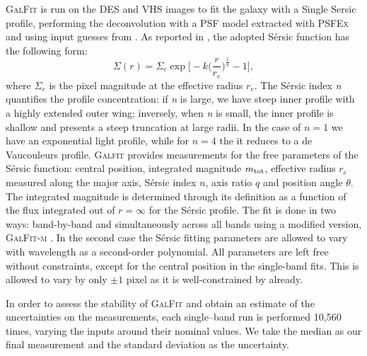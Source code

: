 \textsc{GalFit} is run on the DES and VHS images to fit the galaxy with a Single Sersic profile, performing the deconvolution with a PSF model extracted with \textsc{PSFEx} \citep{psfex} and using input guesses from \sextractor. As reported in  \citep{Peng}, the adopted S\'ersic function has the following form: 
\begin{equation}
\Sigma(r) = \Sigma_e \exp{ \bigg[ -k \bigg(\frac{r}{r_e}\bigg)^{\frac{1}{n}} -1 \bigg]} ,
\label{eq:sersicfunction}
\end{equation}
where $\Sigma_e$ is the pixel magnitude at the effective radius $r_e$. The S\'ersic index \textit{n} quantifies the profile concentration: if \textit{n} is large, we have steep inner profile with a highly extended outer wing;  inversely, when \textit{n} is small, the inner profile is shallow and presents a steep truncation at large radii. In the case of $n=1$ we have an exponential light profile, while for $n=4$ the it reduces to a de Vaucouleurs profile.
\textsc{Galfit} provides measurements for the free parameters of the S\'ersic function: central position, integrated magnitude $m_{\rm tot}$, effective radius $r_e$ measured along the major axis, S\'ersic index $n$, axis ratio $q$ and position angle $\theta$. The integrated magnitude is determined through its definition as a function of the flux integrated out of $r=\infty$ for the S\'ersic profile. %
The fit is done in two ways: band-by-band and simultaneously across all bands using a modified version, \textsc{GalFit-m} \citep{galfitm}. In the second case the S\'ersic fitting parameters are allowed to vary with wavelength as a second-order polynomial. %
All parameters are left free without constraints, except for the central position in the single-band fits. This is allowed to vary by only $\pm 1$ pixel as it is well-constrained by \sextractor already.

In order to assess the stability of \textsc{GalFit} and obtain an estimate of the uncertainties on the measurements, each single--band run is performed 10,560 times, varying the inputs around their nominal values. We take the median as our final measurement and the standard deviation as the uncertainty.

